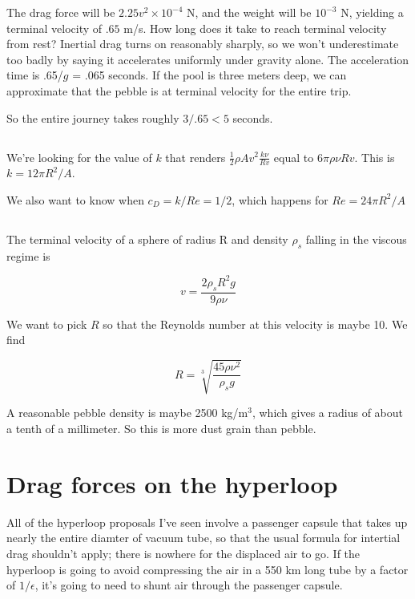 \documentclass[12pt]{article}
\begin{document}
The drag force will be \(2.25v^2 \times 10^{-4}\) N, and the weight will be \(10^{-3}\) N, yielding a terminal velocity of \(.65\) m/s. How long does it take to reach terminal velocity from rest? Inertial drag turns on reasonably sharply, so we won't underestimate too badly by saying it accelerates uniformly under gravity alone. The acceleration time is .65/\(g\) = .065 seconds. If the pool is three meters deep, we can approximate that the pebble is at terminal velocity for the entire trip.

So the entire journey takes roughly \(3/.65 < 5 \) seconds.

\subsection{}

We're looking for the value of \(k\) that renders \(\frac{1}{2}\rho Av^2\frac{k\nu}{Rv}\) equal to \(6\pi\rho\nu Rv\). This is \(k=12\pi R^2/A\).

We also want to know when \(c_D = k/Re = 1/2 \), which happens for \(Re = 24\pi R^2/A\)

\subsection{}

The terminal velocity of a sphere of radius R and density \(\rho_s\) falling in the viscous regime is

\[ v = \frac{2\rho_s R^2g}{9\rho\nu}
\]

We want to pick \(R\) so that the Reynolds number at this velocity is maybe 10. We find

\[ R = \sqrt[3]{\frac{45\rho \nu ^2}{\rho_s g}}
\]

A reasonable pebble density is maybe 2500 kg/m\(^3\), which gives a radius of about a tenth of a millimeter. So this is more dust grain than pebble.

\section{Drag forces on the hyperloop}

All of the hyperloop proposals I've seen involve a passenger capsule that takes up nearly the entire diamter of vacuum tube, so that the usual formula for intertial drag shouldn't apply; there is nowhere for the displaced air to go. If the hyperloop is going to avoid compressing the air in a 550 km long tube by a factor of \(1/\epsilon\), it's going to need to shunt air through the passenger capsule.
\end{document}
